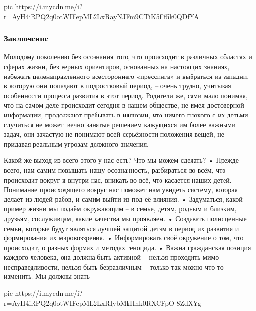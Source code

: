 \ifcmt
pic https://i.mycdn.me/i?r=AyH4iRPQ2q0otWIFepML2LxRayNJFm9CTiK5Ff5k0QDfYA
\fi

\subsubsection{Заключение }

Молодому поколению без осознания того, что происходит в различных областях и
сферах жизни, без верных ориентиров, основанных на настоящих знаниях, избежать
целенаправленного всестороннего «прессинга» и выбраться из западни, в которую
они попадают в подростковый период, – очень трудно, учитывая особенности
процесса развития в этот период. Родители же, сами мало понимая, что на самом
деле происходит сегодня в нашем обществе, не имея достоверной информации,
продолжают пребывать в иллюзии, что ничего плохого с их детьми случиться не
может; вечно занятые решением кажущихся им более важными задач, они зачастую не
понимают всей серьёзности положения вещей, не придавая реальным угрозам
должного значения. 

Какой же выход из всего этого у нас есть? Что мы можем сделать? • Прежде всего,
нам самим повышать нашу осознанность, разбираться во всём, что происходит
вокруг и внутри нас, вникать во всё, что касается наших детей. Понимание
происходящего вокруг нас поможет нам увидеть систему, которая делает из людей
рабов, и самим выйти из-под её влияния. • Задуматься, какой пример жизни мы
подаём окружающим – в семье, детям, родным и близким, друзьям, сослуживцам,
какие качества мы проявляем. • Создавать полноценные семьи, которые будут
являться лучшей защитой детям в период их развития и формирования их
мировоззрения. • Информировать своё окружение о том, что происходит, о разных
формах и методах геноцида. • Важна гражданская позиция каждого человека, она
должна быть активной – нельзя проходить мимо несправедливости, нельзя быть
безразличным – только так можно что-то изменить. Мы должны знать

\ifcmt
pic https://i.mycdn.me/i?r=AyH4iRPQ2q0otWIFepML2LxRIybMkHhk0RXCFpO-8ZdXYg
\fi
